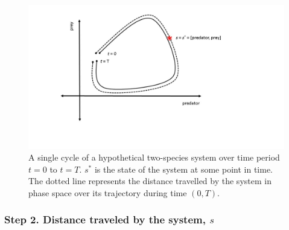 \documentclass[12pt,twoside]{reedthesis}
\begin{document}
\begin{figure}
\includegraphics[width=1\linewidth]{./chapterFiles/fiGuide/figures/stringFig} \caption{A single cycle of a hypothetical two-species system over time period $t = 0$ to $t = T$. $s^*$ is the state of the system at some point in time. The dotted line represents the distance travelled by the system in phase space over its trajectory during time $(0, T)$.}\label{fig:stringFig}
\end{figure}
\subsubsection{\texorpdfstring{\textbf{Step 2.} Distance traveled by the
system,
\(s\)}{Step 2. Distance traveled by the system, s}}\label{step-2.-distance-traveled-by-the-system-s}
\end{document}
